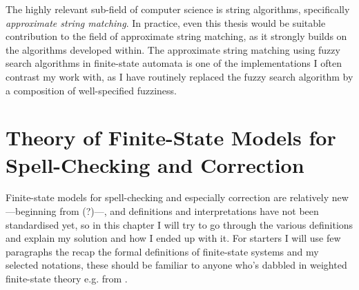 \documentclass[officiallayout]{unihelcompling}
\begin{document}
The highly relevant sub-field of computer science is string algorithms,
specifically \emph{approximate string matching}. In practice, even this
thesis would be suitable contribution to the field of approximate string
matching, as it strongly builds on the algorithms developed within. The
approximate string matching using fuzzy search algorithms in finite-state
automata is one of the implementations I often contrast my work with, as
I have routinely replaced the fuzzy search algorithm by a composition of
well-specified fuzziness.

\section{Theory of Finite-State Models for Spell-Checking and Correction}

Finite-state models for spell-checking and especially correction are relatively
new---beginning from \citep{oflazer1996errortolerant}(?)---, and definitions and
interpretations have not been standardised yet, so in this chapter I will try
to go through the various definitions and explain my solution and how I ended
up with it. For starters I will use few paragraphs the recap the formal
definitions of finite-state systems and my selected notations, these should be
familiar to anyone who's dabbled in weighted finite-state theory e.g. from
\citep{aho2007compilers,mohri1997finitestate}.
\end{document}
